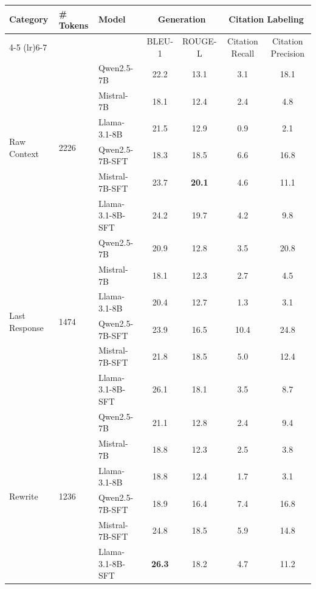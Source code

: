 \documentclass[11pt]{article}
\begin{document}
\begin{table}[tbp]
    \centering
    \setlength{\tabcolsep}{11pt}\renewcommand{\arraystretch}{0.9}
    \setlength{\tabcolsep}{4pt}
    \small %
    \begin{tabular}{@{}p{2.8cm}p{1.5cm}lcccc@{}}
        \toprule
        \multirow{2}{*}{Category} & \multirow{2}{*}{\textbf{\# Tokens}} &\multirow{2}{*}{Model} & \multicolumn{2}{c}{Generation} & \multicolumn{2}{c}{Citation Labeling} \\
        \cmidrule(lr){4-5}
        \cmidrule(lr){6-7}
        & & &BLEU-1 & ROUGE-L & Citation Recall & Citation Precision \\
        \midrule

        \multirow{6}{2.8cm}{Raw Context} & \multirow{6}{*}{2226} &Qwen2.5-7B &  22.2  & 13.1&3.1&18.1 \\
        &&Mistral-7B & 18.1 & 12.4 &2.4 &4.8\\
        &&Llama-3.1-8B & 21.5 & 12.9 & 0.9 & 2.1\\
        \cmidrule(lr){3-7}
        &&Qwen2.5-7B-SFT & 18.3 &  18.5 & 6.6& 16.8\\  
        &&Mistral-7B-SFT & 23.7  & \textbf{20.1} & 4.6 & 11.1\\
        &&Llama-3.1-8B-SFT & 24.2 & 19.7 & 4.2 & 9.8\\

        \midrule
        
        \multirow{6}{*}{Last Response} &\multirow{6}{*}{1474} &Qwen2.5-7B & 20.9 & 12.8 & 3.5 & 20.8 \\
        &&Mistral-7B & 18.1  & 12.3 & 2.7 & 4.5\\
        &&Llama-3.1-8B & 20.4 & 12.7 & 1.3 & 3.1 \\
        \cmidrule(lr){3-7}
        &&Qwen2.5-7B-SFT & 23.9  & 16.5 & 10.4 & 24.8\\  
        &&Mistral-7B-SFT & 21.8 & 18.5 & 5.0 & 12.4\\
        &&Llama-3.1-8B-SFT & 26.1 & 18.1 & 3.5 & 8.7\\
        
        
        \midrule
        \multirow{6}{*}{Rewrite} &\multirow{6}{*}{1236} 
        &Qwen2.5-7B & 21.1  & 12.8 & 2.4& 9.4 \\
        &&Mistral-7B & 18.8  & 12.3 & 2.5 & 3.8 \\
        &&Llama-3.1-8B & 18.8 & 12.4 & 1.7 & 3.1 \\
        \cmidrule(lr){3-7}
        &&Qwen2.5-7B-SFT & 18.9 & 16.4 & 7.4 & 16.8\\
        &&Mistral-7B-SFT & 24.8 & 18.5 & 5.9 & 14.8\\
        &&Llama-3.1-8B-SFT & \textbf{26.3} & 18.2 & 4.7 & 11.2\\


\end{tabular}
\end{table}
\end{document}
